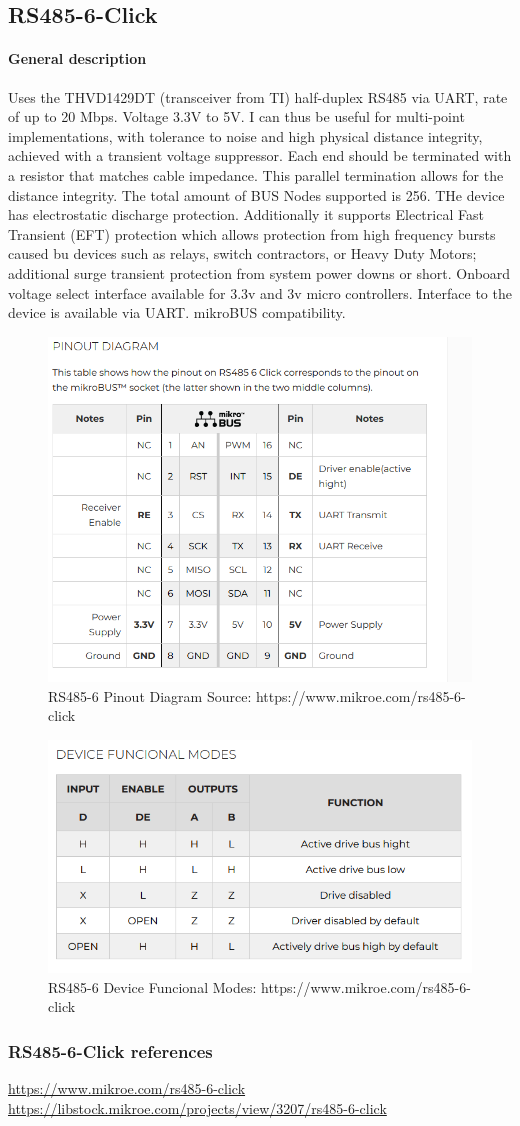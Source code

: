 \subsection{RS485-6-Click}
\paragraph{General description} Uses the THVD1429DT (transceiver from TI) half-duplex RS485 via UART, rate of up to 20 Mbps. Voltage 3.3V to 5V. I can thus be useful for multi-point implementations, with tolerance to noise and  high physical distance integrity, achieved with a transient voltage suppressor. Each end should be terminated with a resistor that matches cable impedance. This parallel termination allows for the distance integrity. The total amount of BUS Nodes supported is 256. THe device has electrostatic discharge protection. Additionally it supports Electrical Fast Transient (EFT) protection which allows protection from high frequency bursts caused bu devices such as relays, switch contractors, or Heavy Duty Motors; additional surge transient protection from system power downs or short. Onboard voltage select interface available for 3.3v and 3v micro controllers. Interface to the device is available via UART. mikroBUS compatibility. 

\begin{figure}
    \centering
    \includegraphics[width=0.5\linewidth]{rs485-pod.png}
    \caption{RS485-6 Pinout Diagram Source: https://www.mikroe.com/rs485-6-click}
    \label{fig:enter-label}
\end{figure}
\begin{figure}
    \centering
    \includegraphics[width=0.5\linewidth]{rs485-dfm.png}
    \caption{RS485-6 Device Funcional Modes: https://www.mikroe.com/rs485-6-click}
    \label{fig:enter-label}
\end{figure}
\subsubsection{RS485-6-Click references}
\url{https://www.mikroe.com/rs485-6-click}
\url{https://libstock.mikroe.com/projects/view/3207/rs485-6-click}